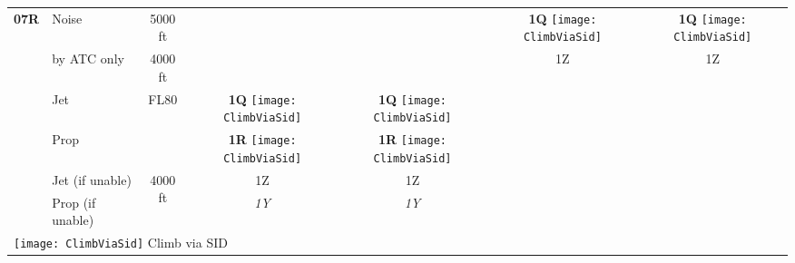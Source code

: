 \documentclass[10pt,landscape,a4paper]{article}
\begin{document}
\begin{textblock}{30}
\begin{table}[]
\begin{tabular}{|l|l|c|c|c|c|c|}
\textbf{07R} & Noise & 5000 ft & & & \textbf{1Q} \texttt{[image: ClimbViaSid]} & \textbf{1Q} \texttt{[image: ClimbViaSid]} \\ \cline{2-7}
& by ATC only & 4000 ft & & & 1Z & 1Z \\ \cline{2-7}
& Jet & \multirow{2}{*}{FL80} & \textbf{1Q} \texttt{[image: ClimbViaSid]} & \textbf{1Q} \texttt{[image: ClimbViaSid]} & & \\ \cline{2-2} \cline{4-7}
& Prop & & \textbf{1R} \texttt{[image: ClimbViaSid]} & \textbf{1R} \texttt{[image: ClimbViaSid]} & & \\ \cline{2-7}
& Jet (if unable) & \multirow{2}{*}{4000 ft} & 1Z & 1Z & & \\ \cline{2-2} \cline{4-7}
& Prop (if unable) & & \textit{1Y} & \textit{1Y} & &  \\ \hline

\multicolumn{7}{l}{\texttt{[image: ClimbViaSid]} \color{red}Climb via SID} \\
\end{tabular}
\end{table}
\end{textblock}
\end{document}
